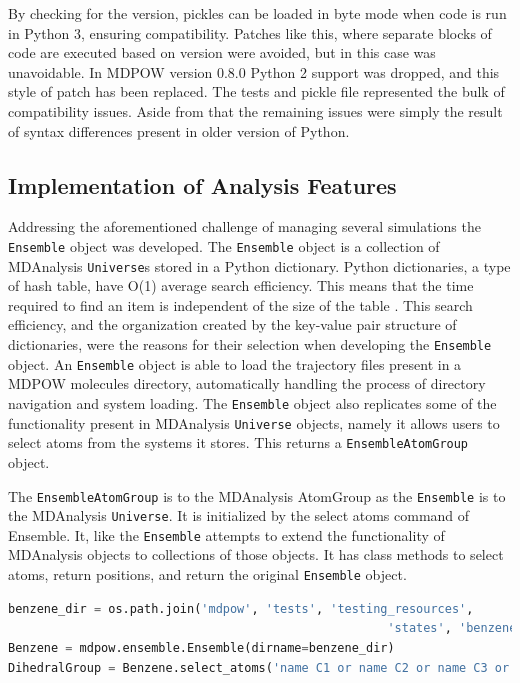 \documentclass{article}[letterpaper, margins=1in, 12pt]
\begin{document}
By checking for the version, pickles can be loaded in byte mode when code is run in Python 3, ensuring compatibility. Patches like this, where separate blocks of code are executed based on version were avoided, but in this case was unavoidable. In MDPOW version 0.8.0 Python 2 support was dropped, and this style of patch has been replaced. The tests and pickle file represented the bulk of compatibility issues. Aside from that the remaining issues were simply the result of syntax differences present in older version of Python.

\subsection{Implementation of Analysis Features}

Addressing the aforementioned challenge of managing several simulations the \texttt{Ensemble} object was developed. The \texttt{Ensemble} object is a collection of MDAnalysis \texttt{Universe}s stored in a Python dictionary. Python dictionaries, a type of hash table, have O(1) average search efficiency. This means that the time required to find an item is independent of the size of the table \cite{cormen_introduction_2009}. This search efficiency, and the organization created by the key-value pair structure of dictionaries, were the reasons for their selection when developing the \texttt{Ensemble} object. An \texttt{Ensemble} object is able to load the trajectory files present in a MDPOW molecules directory, automatically handling the process of  directory navigation and system loading.  The \texttt{Ensemble} object also replicates some of the functionality present in MDAnalysis \texttt{Universe} objects, namely it allows users to select atoms from the systems it stores. This returns a \texttt{EnsembleAtomGroup}  object.

The \texttt{EnsembleAtomGroup}  is to the MDAnalysis AtomGroup as the \texttt{Ensemble} is to the MDAnalysis \texttt{Universe}. It is initialized by the select atoms command of Ensemble. It, like the \texttt{Ensemble} attempts to extend the functionality of MDAnalysis objects to collections of those objects. It has class methods to select atoms, return positions, and return the original \texttt{Ensemble} object.

\begin{lstlisting}[language=Python]
benzene_dir = os.path.join('mdpow', 'tests', 'testing_resources',
													 'states', 'benzene')
Benzene = mdpow.ensemble.Ensemble(dirname=benzene_dir)
DihedralGroup = Benzene.select_atoms('name C1 or name C2 or name C3 or name C4')
\end{lstlisting}
\end{document}
